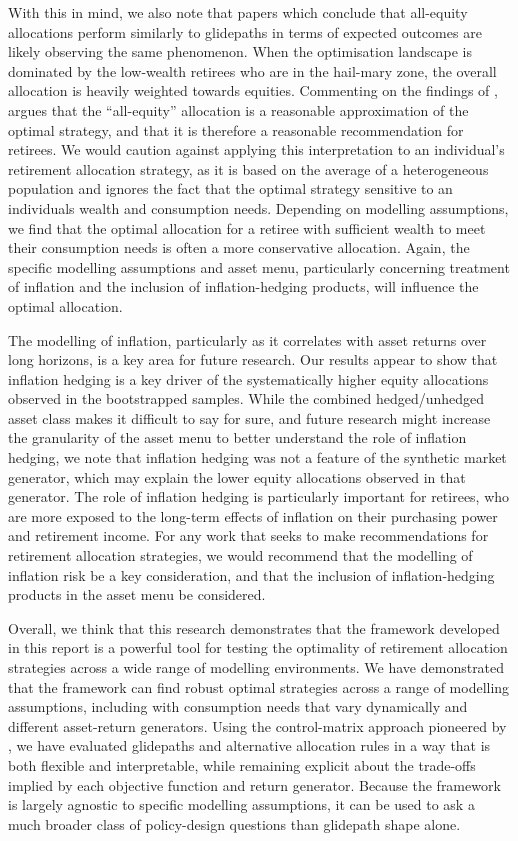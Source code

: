 \documentclass[11pt]{article}
\begin{document}
With this in mind, we also note that papers which conclude that all-equity allocations perform similarly to glidepaths in terms of expected outcomes are likely observing the same phenomenon. When the optimisation landscape is dominated by the low-wealth retirees who are in the hail-mary zone, the overall allocation is heavily weighted towards equities. Commenting on the findings of \textcite{anarkulova2025beyond}, \textcite{felix2025controversial} argues that the ``all-equity'' allocation is a reasonable approximation of the optimal strategy, and that it is therefore a reasonable recommendation for retirees. We would caution against applying this interpretation to an individual's retirement allocation strategy, as it is based on the average of a heterogeneous population and ignores the fact that the optimal strategy sensitive to an individuals wealth and consumption needs. Depending on modelling assumptions, we find that the optimal allocation for a retiree with sufficient wealth to meet their consumption needs is often a more conservative allocation. Again, the specific modelling assumptions and asset menu, particularly concerning treatment of inflation and the inclusion of inflation-hedging products, will influence the optimal allocation.

The modelling of inflation, particularly as it correlates with asset returns over long horizons, is a key area for future research. Our results appear to show that inflation hedging is a key driver of the systematically higher equity allocations observed in the bootstrapped samples. While the combined hedged/unhedged asset class makes it difficult to say for sure, and future research might increase the granularity of the asset menu to better understand the role of inflation hedging, we note that inflation hedging was not a feature of the synthetic market generator, which may explain the lower equity allocations observed in that generator. The role of inflation hedging is particularly important for retirees, who are more exposed to the long-term effects of inflation on their purchasing power and retirement income. For any work that seeks to make recommendations for retirement allocation strategies, we would recommend that the modelling of inflation risk be a key consideration, and that the inclusion of inflation-hedging products in the asset menu be considered.

Overall, we think that this research demonstrates that the framework developed in this report is a powerful tool for testing the optimality of retirement allocation strategies across a wide range of modelling environments. We have demonstrated that the framework can find robust optimal strategies across a range of modelling assumptions, including with consumption needs that vary dynamically and different asset-return generators. Using the control-matrix approach pioneered by \textcite{Makinen2024}, we have evaluated glidepaths and alternative allocation rules in a way that is both flexible and interpretable, while remaining explicit about the trade-offs implied by each objective function and return generator. Because the framework is largely agnostic to specific modelling assumptions, it can be used to ask a much broader class of policy-design questions than glidepath shape alone.
\end{document}
